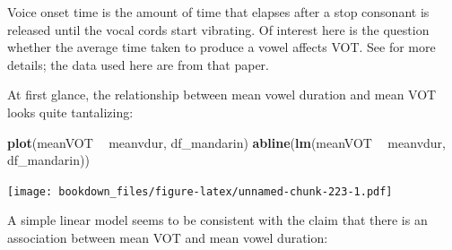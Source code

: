 \documentclass[12pt,]{krantz}
\newenvironment{Shaded}{\begin{snugshade}}{\end{snugshade}}
\newcommand{\CommentTok}[1]{\textcolor[rgb]{0.56,0.35,0.01}{\textit{#1}}}
\newcommand{\DataTypeTok}[1]{\textcolor[rgb]{0.13,0.29,0.53}{#1}}
\newcommand{\KeywordTok}[1]{\textcolor[rgb]{0.13,0.29,0.53}{\textbf{#1}}}
\newcommand{\NormalTok}[1]{#1}
\newcommand{\OperatorTok}[1]{\textcolor[rgb]{0.81,0.36,0.00}{\textbf{#1}}}
\newcommand{\OtherTok}[1]{\textcolor[rgb]{0.56,0.35,0.01}{#1}}
\newcommand{\StringTok}[1]{\textcolor[rgb]{0.31,0.60,0.02}{#1}}
\theoremstyle{definition}
\theoremstyle{definition}
\theoremstyle{definition}
\theoremstyle{remark}
\begin{document}
Voice onset time is the amount of time that elapses after a stop consonant is released until the vocal cords start vibrating. Of interest here is the question whether the average time taken to produce a vowel affects VOT. See \citet{VasishthBeckmanetal} for more details; the data used here are from that paper.

\begin{Shaded}
\end{Shaded}

At first glance, the relationship between mean vowel duration and mean VOT looks quite tantalizing:

\begin{Shaded}
\begin{Highlighting}[]
\KeywordTok{plot}\NormalTok{(meanVOT }\OperatorTok{~}\StringTok{ }\NormalTok{meanvdur, df_mandarin)}
\KeywordTok{abline}\NormalTok{(}\KeywordTok{lm}\NormalTok{(meanVOT }\OperatorTok{~}\StringTok{ }\NormalTok{meanvdur, df_mandarin))}
\end{Highlighting}
\end{Shaded}

\texttt{[image: bookdown\_files/figure-latex/unnamed-chunk-223-1.pdf]}

A simple linear model seems to be consistent with the claim that there is an association between mean VOT and mean vowel duration:
\end{document}
